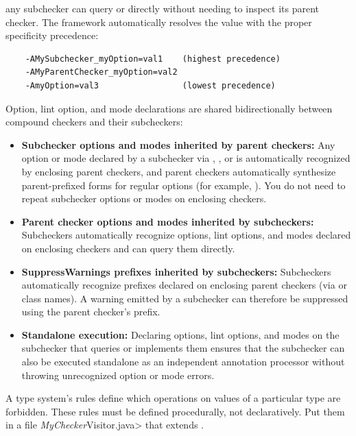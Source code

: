 \noindent
any subchecker can query  or 
directly without needing to inspect its parent checker.
The framework automatically resolves the value with the proper specificity precedence:
\begin{Verbatim}
    -AMySubchecker_myOption=val1    (highest precedence)
    -AMyParentChecker_myOption=val2
    -AmyOption=val3                 (lowest precedence)
\end{Verbatim}

Option, lint option, and mode declarations are shared bidirectionally between compound checkers and their subcheckers:
\begin{itemize}
  \item \textbf{Subchecker options and modes inherited by parent checkers:} Any option or mode declared by a subchecker via , , or  is automatically recognized by enclosing parent checkers, and parent checkers automatically synthesize parent-prefixed forms for regular options (for example, ). You do not need to repeat subchecker options or modes on enclosing checkers.
  \item \textbf{Parent checker options and modes inherited by subcheckers:} Subcheckers automatically recognize options, lint options, and modes declared on enclosing checkers and can query them directly.
  \item \textbf{SuppressWarnings prefixes inherited by subcheckers:} Subcheckers automatically recognize  prefixes declared on enclosing parent checkers (via  or class names). A warning emitted by a subchecker can therefore be suppressed using the parent checker's prefix.
  \item \textbf{Standalone execution:} Declaring options, lint options, and modes on the subchecker that queries or implements them ensures that the subchecker can also be executed standalone as an independent annotation processor without throwing unrecognized option or mode errors.
\end{itemize}




A type system's rules define which operations on values of a
particular type are forbidden.
These rules must be defined procedurally, not declaratively.
Put them in a file \<\emph{MyChecker}Visitor.java> that extends
.


